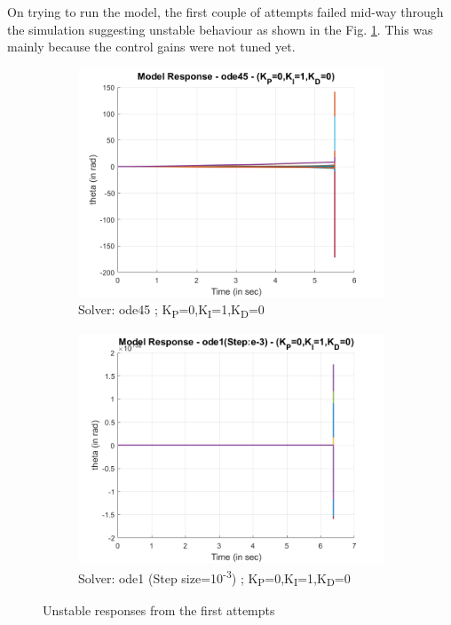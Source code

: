\documentclass[a4paper,12pt]{report}
\begin{document}
On trying to run the model, the first couple of attempts failed mid-way through the simulation suggesting unstable behaviour as shown in the Fig. \ref{unstable-responses}. This was mainly because the control gains were not tuned yet. 
\begin{figure}[H]
	\begin{subfigure}{.5\textwidth}
		\centering
		\includegraphics[width=\linewidth]{images/ode45-unstable.png}  
		\caption{Solver: ode45 ; K\textsubscript{P}=0,K\textsubscript{I}=1,K\textsubscript{D}=0}
	\end{subfigure}
	\begin{subfigure}{.5\textwidth}
		\centering
		\includegraphics[width=\linewidth]{images/ode1-unstable.png}  
		\caption{Solver: ode1 (Step size=10\textsuperscript{-3}) ; K\textsubscript{P}=0,K\textsubscript{I}=1,K\textsubscript{D}=0}
	\end{subfigure}
	\caption{Unstable responses from the first attempts}
	\label{unstable-responses}
\end{figure}
\end{document}
